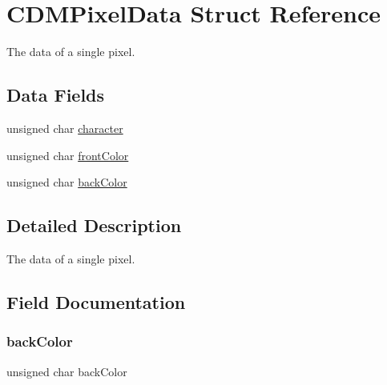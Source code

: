 \hypertarget{struct_c_d_m_pixel_data}{}\section{C\+D\+M\+Pixel\+Data Struct Reference}
\label{struct_c_d_m_pixel_data}


The data of a single pixel.  


\subsection*{Data Fields}
\begin{DoxyCompactItemize}
\item 
unsigned char \mbox{\hyperlink{struct_c_d_m_pixel_data_abe31bdd62e498dce604b14e75df142dd}{character}}
\item 
unsigned char \mbox{\hyperlink{struct_c_d_m_pixel_data_afb6f4c281a6ee8c9f689ee0980ae756d}{front\+Color}}
\item 
unsigned char \mbox{\hyperlink{struct_c_d_m_pixel_data_ad85b1951998b87079fe7ef92ac323ce5}{back\+Color}}
\end{DoxyCompactItemize}


\subsection{Detailed Description}
The data of a single pixel. 

\subsection{Field Documentation}
\mbox{\label{struct_c_d_m_pixel_data_ad85b1951998b87079fe7ef92ac323ce5}} 
\subsubsection{\texorpdfstring{back\+Color}{backColor}}
{\footnotesize\ttfamily unsigned char back\+Color}

\mbox{\label{struct_c_d_m_pixel_data_abe31bdd62e498dce604b14e75df142dd}} 
